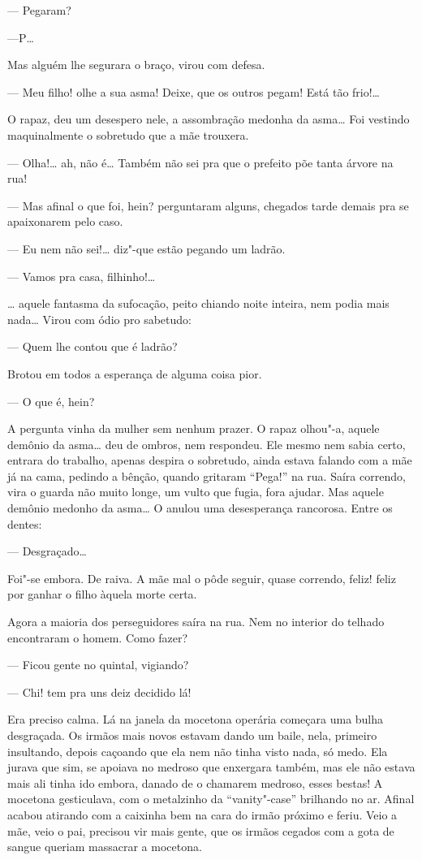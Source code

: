 \begin{linenumbers}
--- Pegaram?

---P\ldots{}

Mas alguém lhe segurara o braço, virou com defesa.

--- Meu filho! olhe a sua asma! Deixe, que os outros pegam! Está tão
frio!\ldots{}

O rapaz, deu um desespero nele, a assombração medonha da asma\ldots{} Foi
vestindo maquinalmente o sobretudo que a mãe trouxera.

--- Olha!\ldots{} ah, não é\ldots{} Também não sei pra que o prefeito põe tanta
árvore na rua!

--- Mas afinal o que foi, hein? perguntaram alguns, chegados tarde
demais pra se apaixonarem pelo caso.

--- Eu nem não sei!\ldots{} diz"-que estão pegando um ladrão.

--- Vamos pra casa, filhinho!\ldots{}

\ldots{} aquele fantasma da sufocação, peito chiando noite inteira, nem podia
mais nada\ldots{} Virou com ódio pro sabetudo:

--- Quem lhe contou que é ladrão?

Brotou em todos a esperança de alguma coisa pior.

--- O que é, hein?

A pergunta vinha da mulher sem nenhum prazer. O rapaz olhou"-a, aquele
demônio da asma\ldots{} deu de ombros, nem respondeu. Ele mesmo nem sabia
certo, entrara do trabalho, apenas despira o sobretudo, ainda estava
falando com a mãe já na cama, pedindo a bênção, quando gritaram
``Pega!'' na rua. Saíra correndo, vira o guarda não muito longe, um
vulto que fugia, fora ajudar. Mas aquele demônio medonho da asma\ldots{} O
anulou uma desesperança rancorosa. Entre os dentes:

--- Desgraçado\ldots{}

Foi"-se embora. De raiva. A mãe mal o pôde seguir, quase correndo, feliz!
feliz por ganhar o filho àquela morte certa.

Agora a maioria dos perseguidores saíra na rua. Nem no interior do
telhado encontraram o homem. Como fazer?

--- Ficou gente no quintal, vigiando?

--- Chi! tem pra uns deiz decidido lá!

Era preciso calma. Lá na janela da mocetona operária começara uma bulha
desgraçada. Os irmãos mais novos estavam dando um baile, nela, primeiro
insultando, depois caçoando que ela nem não tinha visto nada, só medo.
Ela jurava que sim, se apoiava no medroso que enxergara também, mas ele
não estava mais ali tinha ido embora, danado de o chamarem medroso,
esses bestas! A mocetona gesticulava, com o metalzinho da
``vanity"-case'' brilhando no ar. Afinal acabou atirando com a caixinha
bem na cara do irmão próximo e feriu. Veio a mãe, veio o pai, precisou
vir mais gente, que os irmãos cegados com a gota de sangue queriam
massacrar a mocetona.


\end{linenumbers}
